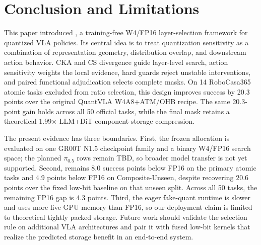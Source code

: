 \section{Conclusion and Limitations}
\label{sec:conclusion}

This paper introduced \method, a training-free W4/FP16 layer-selection framework for quantized VLA policies. Its central idea is to treat quantization sensitivity as a combination of representation geometry, distribution overlap, and downstream action behavior. CKA and CS divergence guide layer-level search, action sensitivity weights the local evidence, hard guards reject unstable interventions, and paired functional adjudication selects complete masks. On 14 RoboCasa365 atomic tasks excluded from ratio selection, this design improves success by 20.3 points over the original QuantVLA W4A8+ATM/OHB recipe. The same 20.3-point gain holds across all 50 official tasks, while the final mask retains a theoretical 1.99$\times$ LLM+DiT component-storage compression.

The present evidence has three boundaries. First, the frozen allocation is evaluated on one GR00T N1.5 checkpoint family and a binary W4/FP16 search space; the planned $\pi_{0.5}$ rows remain TBD, so broader model transfer is not yet supported. Second, \method remains 8.0 success points below FP16 on the primary atomic tasks and 4.9 points below FP16 on Composite-Unseen, despite recovering 20.6 points over the fixed low-bit baseline on that unseen split. Across all 50 tasks, the remaining FP16 gap is 4.3 points. Third, the eager fake-quant runtime is slower and uses more live GPU memory than FP16, so our deployment claim is limited to theoretical tightly packed storage. Future work should validate the selection rule on additional VLA architectures and pair it with fused low-bit kernels that realize the predicted storage benefit in an end-to-end system.
